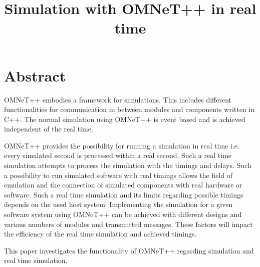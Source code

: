 \documentclass[10pt,a4paper]{article}
\begin{document}
    \title{Simulation with OMNeT++ in real time}
    \maketitle
    \section{Abstract}
    OMNeT++ embodies a framework for simulations. This includes different functionalities for communication in between modules and components written in C++.
    The normal simulation using OMNeT++ is event based and is achieved independent of the real time.
    
    OMNeT++ provides the possibility for running a simulation in real time i.e. every simulated second is processed within a real second. Such a real time simulation attempts to process the simulation with the timings and delays.
    Such a possibility to run simulated software with real timings allows the field of emulation and the connection of simulated components with real hardware or software.
    Such a real time simulation and its limits regarding possible timings depends on the used host system.
    Implementing the simulation for a given software system using OMNeT++ can be achieved with different designs and various numbers of modules and transmitted messages.
    These factors will impact the efficiency of the real time simulation and achieved timings.
    
    This paper investigates the functionality of OMNeT++ regarding simulation and real time simulation.
    
\end{document}
